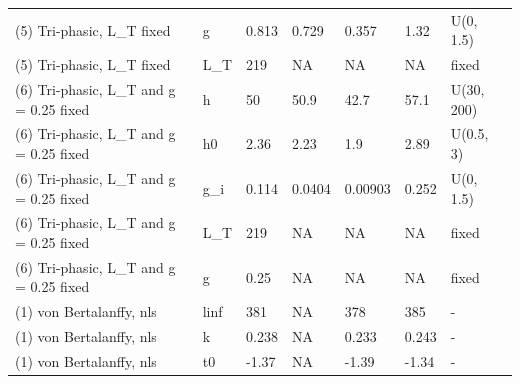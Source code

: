 \begin{table}
\begin{tabular}[t]{lllllll}
(5) Tri-phasic, L\_T fixed & g & 0.813 & 0.729 & 0.357 & 1.32 & U(0, 1.5)\\
(5) Tri-phasic, L\_T fixed & L\_T & 219 & NA & NA & NA & fixed\\
(6) Tri-phasic, L\_T and g = 0.25 fixed & h & 50 & 50.9 & 42.7 & 57.1 & U(30, 200)\\
(6) Tri-phasic, L\_T and g = 0.25 fixed & h0 & 2.36 & 2.23 & 1.9 & 2.89 & U(0.5, 3)\\
\addlinespace
(6) Tri-phasic, L\_T and g = 0.25 fixed & g\_i & 0.114 & 0.0404 & 0.00903 & 0.252 & U(0, 1.5)\\
(6) Tri-phasic, L\_T and g = 0.25 fixed & L\_T & 219 & NA & NA & NA & fixed\\
(6) Tri-phasic, L\_T and g = 0.25 fixed & g & 0.25 & NA & NA & NA & fixed\\
(1) von Bertalanffy, nls & linf & 381 & NA & 378 & 385 & -\\
(1) von Bertalanffy, nls & k & 0.238 & NA & 0.233 & 0.243 & -\\
\addlinespace
(1) von Bertalanffy, nls & t0 & -1.37 & NA & -1.39 & -1.34 & -\\
\bottomrule
\end{tabular}
\end{table}
